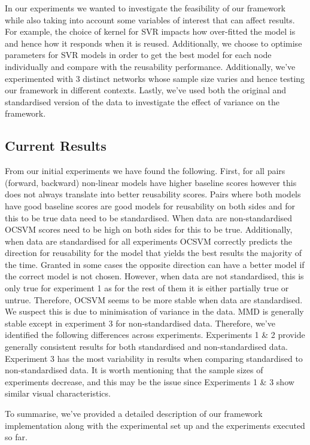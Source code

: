 \documentclass{mprop}
\begin{document}
In our experiments we wanted to investigate the feasibility of our framework while also taking into account some variables of interest that can affect results. For example, the choice of kernel for SVR impacts how over-fitted the model is and hence how it responds when it is reused. Additionally, we choose to optimise parameters for SVR models in order to get the best model for each node individually and compare with the reusability performance. Additionally, we've experimented with 3 distinct networks whose sample size varies and hence testing our framework in different contexts. Lastly, we've used both the original and standardised version of the data to investigate the effect of variance on the framework.

\subsection{Current Results}\label{section:CR}

From our initial experiments we have found the following. First, for all pairs (forward, backward) non-linear models have higher baseline scores however this does not always translate into better reusability scores. Pairs where both models have good baseline scores are good models for reusability on both sides and for this to be true data need to be standardised. When data are non-standardised OCSVM scores need to be high on both sides for this to be true. Additionally, when data are standardised for all experiments OCSVM correctly predicts the direction for reusability for the model that yields the best results the majority of the time. Granted in some cases the opposite direction can have a better model if the correct model is not chosen. However, when data are not standardised, this is only true for experiment 1 as for the rest of them it is either partially true or untrue. Therefore, OCSVM seems to be more stable when data are standardised.  We suspect this is due to minimisation of variance in the data. MMD is generally stable except in experiment 3 for non-standardised data. Therefore, we've identified the following differences across experiments. Experiments 1 \& 2 provide generally consistent results for both standardised and non-standardised data.  Experiment 3 has the most variability in results when comparing standardised to non-standardised data. It is worth mentioning that the sample sizes of experiments decrease, and this may be the issue since Experiments 1 \& 3 show similar visual characteristics.

To summarise, we've provided a detailed description of our framework implementation along with the experimental set up and the experiments executed so far.
\end{document}
